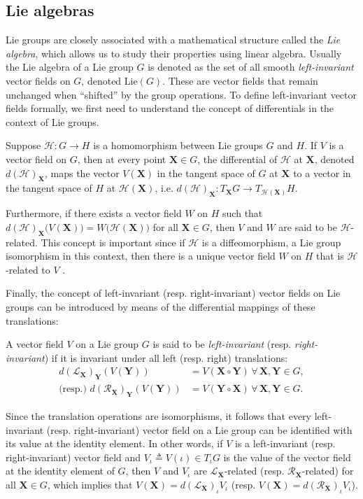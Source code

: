 \subsection{Lie algebras}
Lie groups are closely associated with a mathematical structure called the \emph{Lie algebra}, which allows us to study their properties using linear algebra. Usually the Lie algebra of a Lie group $G$ is denoted as the set of all smooth \emph{left-invariant} vector fields on $G$, denoted $\text{Lie}(G)$. These are vector fields that remain unchanged when ``shifted'' by the group operations. To define left-invariant vector fields formally, we first need to understand the concept of differentials in the context of Lie groups.

Suppose $\mathcal{H}:G\to H$ is a homomorphism between Lie groups $G$ and $H$. If $V$ is a vector field on $G$, then at every point $\mathbf{X}\in G$, the differential of $\mathcal{H}$ at $\mathbf{X}$, denoted $d(\mathcal{H})_\mathbf{X}$, maps the vector $V(\mathbf{X})$ in the tangent space of $G$ at $\mathbf{X}$ to a vector in the tangent space of $H$ at $\mathcal{H}(\mathbf{X})$, i.e. $d(\mathcal{H})_\mathbf{X}:T_\mathbf{X}G\to T_{\mathcal{H}(\mathbf{X})}H$.

Furthermore, if there exists a vector field $W$ on $H$ such that $d(\mathcal{H})_\mathbf{X}\bigl(V(\mathbf{X})\bigr) = W\bigl(\mathcal{H}(\mathbf{X})\bigr)$ for all $\mathbf{X}\in G$, then $V$ and $W$ are said to be $\mathcal{H}$-related. This concept is important since if $\mathcal{H}$ is a diffeomorphism, a Lie group isomorphism in this context, then there is a unique vector field $W$ on $H$ that is $\mathcal{H}$-related to $V$ \citep[p. 183]{Lee2012}.

Finally, the concept of left-invariant (resp. right-invariant) vector fields on Lie groups can be introduced by means of the differential mappings of these translations:
\begin{definition}
    A vector field $V$ on a Lie group $G$ is said to be \emph{left-invariant} (resp. \emph{right-invariant}) if it is invariant under all left (resp. right) translations:
    \begin{align*}
        d(\mathcal{L}_\mathbf{X})_\mathbf{Y}(V(\mathbf{Y})) &= V(\mathbf{X}\circ\mathbf{Y}) \,\forall\,\mathbf{X},\mathbf{Y}\in G,\\
        \text{(resp.) }d(\mathcal{R}_\mathbf{X})_\mathbf{Y}(V(\mathbf{Y})) &= V(\mathbf{Y}\circ\mathbf{X}) \,\forall\,\mathbf{X},\mathbf{Y}\in G.
    \end{align*}  
\end{definition}
Since the translation operations are isomorphisms, it follows that every left-invariant (resp. right-invariant) vector field on a Lie group can be identified with its value at the identity element. In other words, if $V$ is a left-invariant (resp. right-invariant) vector field and $V_\iota\triangleq V(\iota) \in T_\iota G$ is the value of the vector field at the identity element of $G$, then $V$ and $V_\iota$ are $\mathcal{L}_\mathbf{X}$-related (resp. $\mathcal{R}_\mathbf{X}$-related) for all $\mathbf{X}\in G$, which implies that $V(\mathbf{X}) = d(\mathcal{L}_\mathbf{X})_\iota V_\iota$ (resp. $V(\mathbf{X}) = d(\mathcal{R}_\mathbf{X})_\iota V_\iota$).

